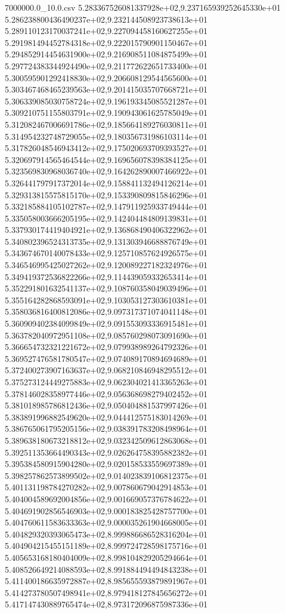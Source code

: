 \begin{filecontents*}{7000000.0_10.0.csv}
5.283367526081337928e+02,9.237165939252645330e+01
5.286238800436490237e+02,9.232144508923738613e+01
5.289110123170037241e+02,9.227094458160627255e+01
5.291981494452784318e+02,9.222015790901150467e+01
5.294852914454631900e+02,9.216908511084875499e+01
5.297724383344924490e+02,9.211772622651733400e+01
5.300595901292418830e+02,9.206608129544565600e+01
5.303467468465239563e+02,9.201415035707668721e+01
5.306339085030758724e+02,9.196193345085521287e+01
5.309210751155803791e+02,9.190943061625785049e+01
5.312082467006691786e+02,9.185664189276030811e+01
5.314954232748729055e+02,9.180356731986103114e+01
5.317826048546943412e+02,9.175020693709393527e+01
5.320697914565464544e+02,9.169656078398384125e+01
5.323569830968036740e+02,9.164262890007466922e+01
5.326441797917372014e+02,9.158841132494126214e+01
5.329313815575815170e+02,9.153390809815846296e+01
5.332185884105102787e+02,9.147911925933749444e+01
5.335058003666205195e+02,9.142404484809139831e+01
5.337930174419404921e+02,9.136868490406322962e+01
5.340802396524313735e+02,9.131303946688876749e+01
5.343674670140078433e+02,9.125710857624926575e+01
5.346546995425027262e+02,9.120089227182324976e+01
5.349419372536822266e+02,9.114439059332653414e+01
5.352291801632541137e+02,9.108760358049039496e+01
5.355164282868593091e+02,9.103053127303610381e+01
5.358036816400812086e+02,9.097317371074041148e+01
5.360909402384099849e+02,9.091553093336915481e+01
5.363782040972951108e+02,9.085760298073091690e+01
5.366654732321221672e+02,9.079938989264792326e+01
5.369527476581780547e+02,9.074089170894694689e+01
5.372400273907163637e+02,9.068210846948295512e+01
5.375273124449275883e+02,9.062304021413365263e+01
5.378146028358977446e+02,9.056368698279402452e+01
5.381018985786812436e+02,9.050404881537997426e+01
5.383891996882549620e+02,9.044412575183014269e+01
5.386765061795205156e+02,9.038391783208498964e+01
5.389638180673218812e+02,9.032342509612863068e+01
5.392511353664490343e+02,9.026264758395882382e+01
5.395384580915904280e+02,9.020158533559697389e+01
5.398257862573899502e+02,9.014023839106812375e+01
5.401131198784270282e+02,9.007860679042914853e+01
5.404004589692004856e+02,9.001669057376784622e+01
5.404691902856546903e+02,9.000183825428757700e+01
5.404760611583633363e+02,9.000035261904668005e+01
5.404829320393065473e+02,8.999886686528316204e+01
5.404904215455151189e+02,8.999724728598175716e+01
5.405653168180404009e+02,8.998104829205294664e+01
5.408526649214088593e+02,8.991884494494843238e+01
5.411400186635972887e+02,8.985655593879891967e+01
5.414273780507498941e+02,8.979418127845656272e+01
5.417147430889765474e+02,8.973172096875987336e+01

\end{filecontents*}
